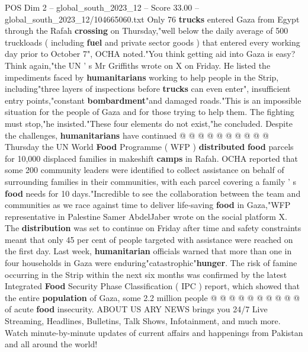 \begin{textsample}{POS Dim 2 – global\_south\_2023\_12 – Score 33.00 – global\_south\_2023\_12/104665060.txt}
Only 76 \textbf{trucks} entered Gaza from Egypt through the Rafah \textbf{crossing} on Thursday,"well below the daily average of 500 truckloads ( including \textbf{fuel} and private sector goods ) that entered every working day prior to October 7", OCHA noted."You think getting aid into Gaza is easy?
Think again,"the UN ' s Mr Griffiths wrote on X on Friday.
He listed the impediments faced by \textbf{humanitarians} working to help people in the Strip, including"three layers of inspections before \textbf{trucks} can even enter", insufficient entry points,"constant \textbf{bombardment}"and damaged roads."This is an impossible situation for the people of Gaza and for those trying to help them.
The fighting must stop,"he insisted."These four elements do not exist,"he concluded.
Despite the challenges, \textbf{humanitarians} have continued @ @ @ @ @ @ @ @ @ @ Thursday the UN World \textbf{Food} Programme ( WFP ) \textbf{distributed} \textbf{food} parcels for 10,000 displaced families in makeshift \textbf{camps} in Rafah.
OCHA reported that some 200 community leaders were identified to collect assistance on behalf of surrounding families in their communities, with each parcel covering a family ' s \textbf{food} needs for 10 days."Incredible to see the collaboration between the team and communities as we race against time to deliver life-saving \textbf{food} in Gaza,"WFP representative in Palestine Samer AbdelJaber wrote on the social platform X.
The \textbf{distribution} was set to continue on Friday after time and safety constraints meant that only 45 per cent of people targeted with assistance were reached on the first day.
Last week, \textbf{humanitarian} officials warned that more than one in four households in Gaza were enduring"catastrophic"\textbf{hunger}.
The risk of famine occurring in the Strip within the next six months was confirmed by the latest Integrated \textbf{Food} Security Phase Classification ( IPC ) report, which showed that the entire \textbf{population} of Gaza, some 2.2 million people @ @ @ @ @ @ @ @ @ @ of acute \textbf{food} insecurity.
ABOUT US ARY NEWS brings you 24/7 Live Streaming, Headlines, Bulletins, Talk Shows, Infotainment, and much more.
Watch minute-by-minute updates of current affairs and happenings from Pakistan and all around the world!

\end{textsample}

